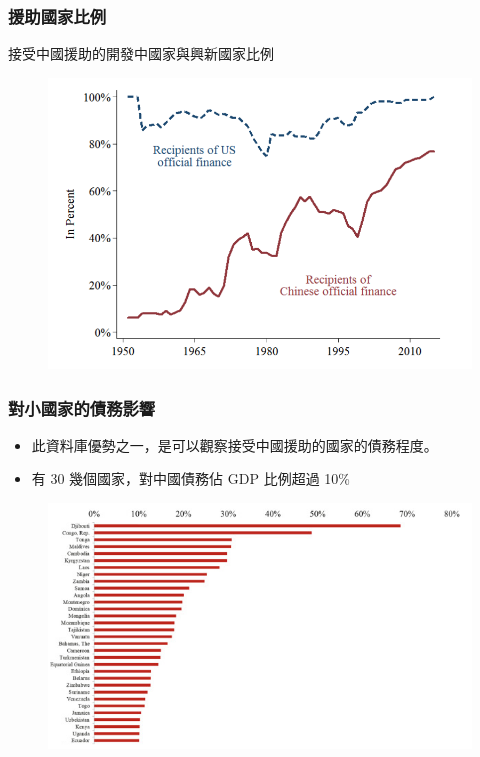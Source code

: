 \begin{frame}
    \frametitle{援助國家比例}
    接受中國援助的開發中國家與興新國家比例
    \begin{figure}
        \includegraphics[height = 0.7\textheight]{fig/fig5.png}
    \end{figure}

\end{frame}

\begin{frame}
    \frametitle{對小國家的債務影響}

    \begin{itemize}
        \item 此資料庫優勢之一，是可以觀察接受中國援助的國家的債務程度。
        \item 有 30 幾個國家，對中國債務佔 GDP 比例超過 10\%
    \end{itemize}
    \begin{figure}
        \includegraphics[height = 0.7\textheight]{fig/fig6.png}
    \end{figure}
\end{frame}

